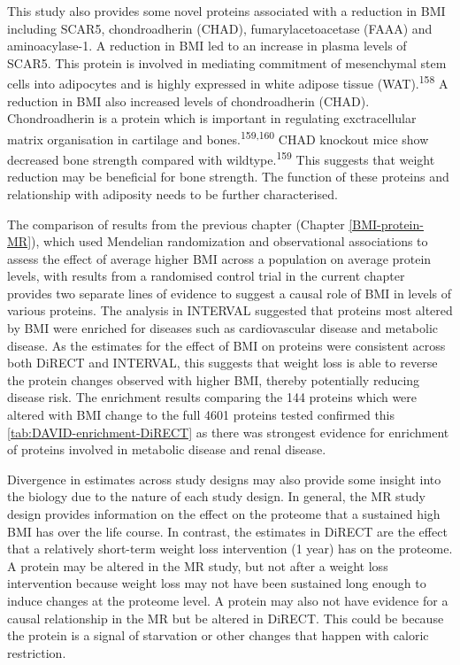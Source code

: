 \documentclass[11pt,twoside]{bristolthesis}
\begin{document}
This study also provides some novel proteins associated with a reduction in BMI including SCAR5, chondroadherin (CHAD), fumarylacetoacetase (FAAA) and aminoacylase-1. A reduction in BMI led to an increase in plasma levels of SCAR5. This protein is involved in mediating commitment of mesenchymal stem cells into adipocytes and is highly expressed in white adipose tissue (WAT).\textsuperscript{158} A reduction in BMI also increased levels of chondroadherin (CHAD). Chondroadherin is a protein which is important in regulating exctracellular matrix organisation in cartilage and bones.\textsuperscript{159,160} CHAD knockout mice show decreased bone strength compared with wildtype.\textsuperscript{159} This suggests that weight reduction may be beneficial for bone strength. The function of these proteins and relationship with adiposity needs to be further characterised.

The comparison of results from the previous chapter (Chapter \ref{BMI-protein-MR}), which used Mendelian randomization and observational associations to assess the effect of average higher BMI across a population on average protein levels, with results from a randomised control trial in the current chapter provides two separate lines of evidence to suggest a causal role of BMI in levels of various proteins. The analysis in INTERVAL suggested that proteins most altered by BMI were enriched for diseases such as cardiovascular disease and metabolic disease. As the estimates for the effect of BMI on proteins were consistent across both DiRECT and INTERVAL, this suggests that weight loss is able to reverse the protein changes observed with higher BMI, thereby potentially reducing disease risk. The enrichment results comparing the 144 proteins which were altered with BMI change to the full 4601 proteins tested confirmed this \ref{tab:DAVID-enrichment-DiRECT} as there was strongest evidence for enrichment of proteins involved in metabolic disease and renal disease.

Divergence in estimates across study designs may also provide some insight into the biology due to the nature of each study design. In general, the MR study design provides information on the effect on the proteome that a sustained high BMI has over the life course. In contrast, the estimates in DiRECT are the effect that a relatively short-term weight loss intervention (1 year) has on the proteome. A protein may be altered in the MR study, but not after a weight loss intervention because weight loss may not have been sustained long enough to induce changes at the proteome level. A protein may also not have evidence for a causal relationship in the MR but be altered in DiRECT. This could be because the protein is a signal of starvation or other changes that happen with caloric restriction.
\end{document}
